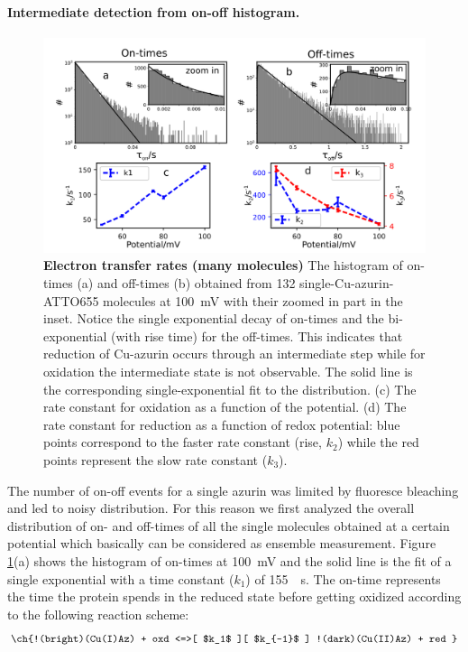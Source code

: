 \documentclass[journal=jacsat,manuscript=article]{achemso}
\begin{document}
\paragraph*{Intermediate detection from on-off histogram.}
\begin{figure}
	\centering
	\includegraphics[width=\textwidth]{many_sm_hist}
	\caption{\textbf{Electron transfer rates (many molecules)} The histogram of on-times (a) and off-times (b) obtained from 132 single-Cu-azurin-ATTO655 molecules at \SI{100}{\mV} with their zoomed in part in the inset.
	Notice the single exponential decay of on-times and the bi-exponential (with rise time) for the off-times.
	This indicates that  reduction of Cu-azurin occurs through an intermediate step while for oxidation the intermediate state is not observable.
	The solid line is the corresponding single-exponential fit to the distribution.
	(c) The rate constant for oxidation as a function of the potential. 
	(d) The rate constant for reduction as a function of redox potential: blue points correspond to the faster rate constant (rise, $k_2$) while the red points represent the slow rate constant ($k_3$).}
	\label{fig:many_sm_hist}
\end{figure}
The number of on-off events for a single azurin was limited by fluoresce bleaching and led to noisy distribution.
For this reason we first analyzed the overall distribution of on- and off-times of all the single molecules obtained at a certain potential which basically can be considered as ensemble measurement.
Figure \ref{fig:many_sm_hist}(a) shows the histogram of on-times at \SI{100}{\mV} and the solid line is the fit of a single exponential with a time constant ($k_{1}$) of \SI{155}{\per\s}.
The on-time represents the time the protein spends in the reduced state before getting oxidized according to the following reaction scheme:
\begin{align}
	\ch{!(bright)(Cu(I)Az) + oxd <=>[ $k_1$ ][ $k_{-1}$ ] !(dark)(Cu(II)Az) + red }
	\label{eq:oxidation}
\end{align}
\end{document}
